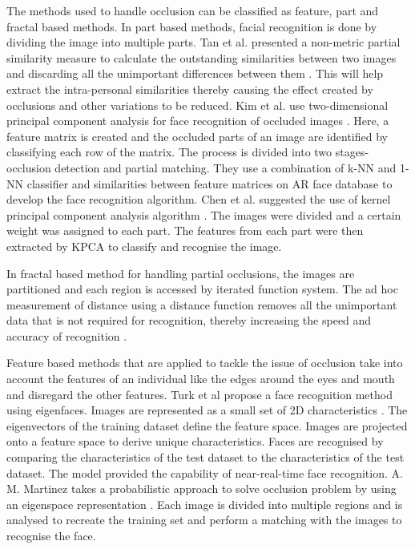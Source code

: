 \documentclass[conference]{IEEEtran}
\begin{document}
The methods used to handle occlusion can be classified as feature, part and fractal based methods. In part based methods, facial recognition is done by dividing the image into multiple parts. Tan et al. presented a non-metric partial similarity measure to calculate the outstanding similarities between two images and discarding all the unimportant differences between them \cite{tan2006learning}. This will help  extract the intra-personal similarities thereby causing the effect created by occlusions and other variations to be reduced. Kim et al. use two-dimensional principal component analysis for face recognition of occluded images \cite{kim2007occlusion}. Here, a feature matrix is created and the occluded parts of an image are identified by classifying each row of the matrix. The process is divided into two stages- occlusion detection and partial matching. They use a combination of k-NN and 1-NN classifier and similarities between feature matrices on AR face database to develop the face recognition algorithm. Chen et al. suggested the use of kernel principal component analysis algorithm \cite{chen2016recognition}. The images were divided and a certain weight was assigned to each part. The features from each part were then extracted by KPCA to classify and recognise the image.

In fractal based method for handling partial occlusions, the images are partitioned and each region is accessed by iterated function system. The ad hoc measurement of distance using a distance function removes all the unimportant data that is not required for recognition, thereby increasing the speed and accuracy of recognition \cite{abate20072d}.

Feature based methods that are applied to tackle the issue of occlusion take into account the features of an individual like the edges around the eyes and mouth and disregard the other features. Turk et al propose a face recognition method using eigenfaces. Images are represented as a small set of 2D characteristics \cite{turk1991face}. The eigenvectors of the training dataset define the  feature space. Images are projected onto a feature space to derive unique characteristics. Faces are recognised by comparing the characteristics of the test dataset to the characteristics of the test dataset. The model provided the  capability of near-real-time face recognition. A. M. Martinez takes a probabilistic approach to solve occlusion problem by using an eigenspace representation \cite{martinez2000recognition}. Each image is divided into multiple regions and is analysed to recreate the training set and perform a matching with the images to recognise the face.
\end{document}
